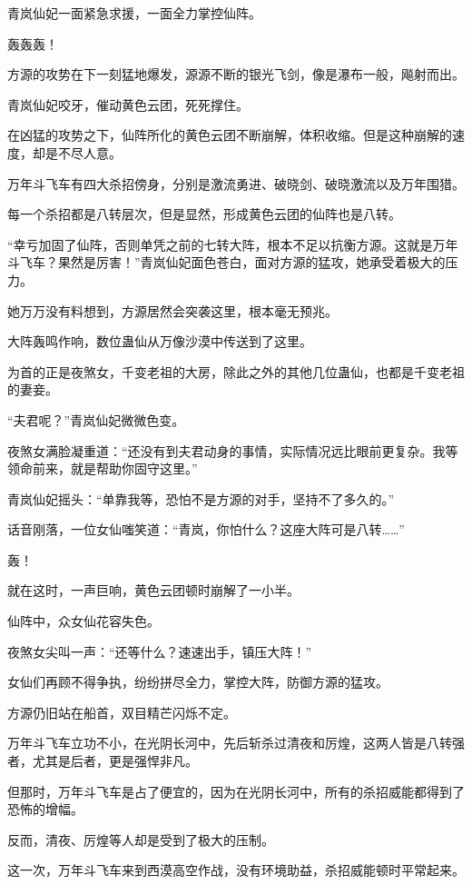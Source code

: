 \begin{this_body}
青岚仙妃一面紧急求援，一面全力掌控仙阵。

轰轰轰！

方源的攻势在下一刻猛地爆发，源源不断的银光飞剑，像是瀑布一般，飚射而出。

青岚仙妃咬牙，催动黄色云团，死死撑住。

在凶猛的攻势之下，仙阵所化的黄色云团不断崩解，体积收缩。但是这种崩解的速度，却是不尽人意。

万年斗飞车有四大杀招傍身，分别是激流勇进、破晓剑、破晓激流以及万年围猎。

每一个杀招都是八转层次，但是显然，形成黄色云团的仙阵也是八转。

“幸亏加固了仙阵，否则单凭之前的七转大阵，根本不足以抗衡方源。这就是万年斗飞车？果然是厉害！”青岚仙妃面色苍白，面对方源的猛攻，她承受着极大的压力。

她万万没有料想到，方源居然会突袭这里，根本毫无预兆。

大阵轰鸣作响，数位蛊仙从万像沙漠中传送到了这里。

为首的正是夜煞女，千变老祖的大房，除此之外的其他几位蛊仙，也都是千变老祖的妻妾。

“夫君呢？”青岚仙妃微微色变。

夜煞女满脸凝重道：“还没有到夫君动身的事情，实际情况远比眼前更复杂。我等领命前来，就是帮助你固守这里。”

青岚仙妃摇头：“单靠我等，恐怕不是方源的对手，坚持不了多久的。”

话音刚落，一位女仙嗤笑道：“青岚，你怕什么？这座大阵可是八转……”

轰！

就在这时，一声巨响，黄色云团顿时崩解了一小半。

仙阵中，众女仙花容失色。

夜煞女尖叫一声：“还等什么？速速出手，镇压大阵！”

女仙们再顾不得争执，纷纷拼尽全力，掌控大阵，防御方源的猛攻。

方源仍旧站在船首，双目精芒闪烁不定。

万年斗飞车立功不小，在光阴长河中，先后斩杀过清夜和厉煌，这两人皆是八转强者，尤其是后者，更是强悍非凡。

但那时，万年斗飞车是占了便宜的，因为在光阴长河中，所有的杀招威能都得到了恐怖的增幅。

反而，清夜、厉煌等人却是受到了极大的压制。

这一次，万年斗飞车来到西漠高空作战，没有环境助益，杀招威能顿时平常起来。


\end{this_body}
